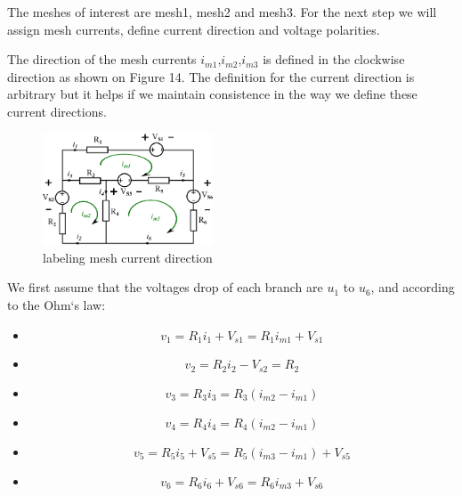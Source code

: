 \documentclass[a4 paper]{article}
\numberwithin{equation}{section}
\newcommand{\0}{\mathbf{0}}
\begin{document}
The meshes of interest are mesh1, mesh2 and mesh3.
For the next step we will assign mesh currents, define current direction and voltage polarities. 

The direction of the mesh currents $i_{m1}$,$i_{m2}$,$i_{m3}$ is defined in the clockwise direction as shown on Figure 14. The definition for the current direction is arbitrary but it helps if we maintain consistence in the way we define these current directions. 

\begin{figure}[ht!]
  \caption{labeling mesh current direction}
  \centering
  \hspace{5 mm}
  \includegraphics[width=0.45\textwidth]{./images/meshmethod}
\end{figure}

We first assume that the voltages drop of each branch are $u_1$ to $u_6$, and according to the Ohm`s law:

\begin{itemize} \itemsep1pt \parskip0pt  
  \item[] \hspace{6.6 cm}\begin{equation}v_1 = R_1i_1 + V_{s1} = R_1i_{m1} + V_{s1}\end{equation}
  \item[] \hspace{6.6 cm}\begin{equation}v_2 = R_2i_2 - V_{s2} = R_2\end{equation}
  \item[] \hspace{6.6 cm}\begin{equation}v_3 = R_3i_3 = R_3(i_{m2} - i_{m1})\end{equation}
  \item[] \hspace{6.6 cm}\begin{equation}v_4 = R_4i_4 = R_4(i_{m2}-i_{m1})\end{equation}
  \item[] \hspace{6.6 cm}\begin{equation}v_5 = R_5i_5 + V_{s5} = R_5(i_{m3}-i_{m1}) + V_{s5}\end{equation}
  \item[] \hspace{6.6 cm}\begin{equation}v_6 = R_6i_6 + V_{s6}= R_6i_{m3} + V_{s6}\end{equation}
\end{itemize}
\end{document}
